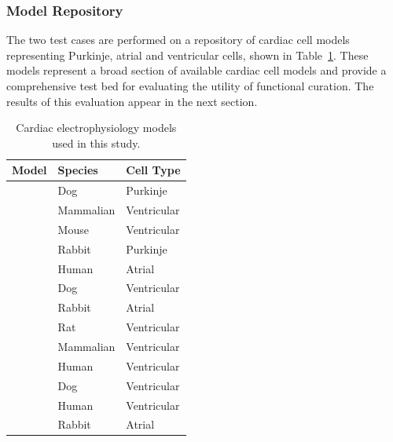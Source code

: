 \documentclass[preprint,authoryear,12pt]{elsarticle}
\begin{document}
\subsubsection{Model Repository}
\label{sec:intro-models}

The two test cases are performed on a repository of cardiac cell models representing Purkinje, atrial and ventricular cells, shown in Table~\ref{tab:CellModels}.
These models represent a broad section of available cardiac cell models and provide a comprehensive test bed for evaluating the utility of functional curation.
The results of this evaluation appear in the next section.

\begin{table}
\begin{center}
\caption{Cardiac electrophysiology models used in this study.}
\label{tab:CellModels}
\begin{tabular}{l l l}
\toprule
Model & Species & Cell Type \\
\midrule
\citet{aslanidi2009optimal} & Dog & Purkinje \\
\citet{beeler1977reconstruction} & Mammalian & Ventricular\\
\citet{bondarenko2004computer} & Mouse & Ventricular \\
\citet{corrias2011ionic} & Rabbit & Purkinje \\
\citet{courtemanche1998ionic} & Human & Atrial\\
\citet{decker2009properties}	 & Dog & Ventricular\\
\citet{earm1990model}	& Rabbit & Atrial\\
\citet{espinosa1998}	& Rat & Ventricular \\
\citet{faber2000action} &  Mammalian & Ventricular\\
\citet{fink2008contributions}	& Human & Ventricular \\
\citet{fox2002ionic}	& Dog & Ventricular\\
\citet{grandi2010novel}	& Human & Ventricular \\
\citet{hilgemann1987excitation}	& Rabbit & Atrial\\

\end{tabular}
\end{center}
\end{table}
\end{document}
